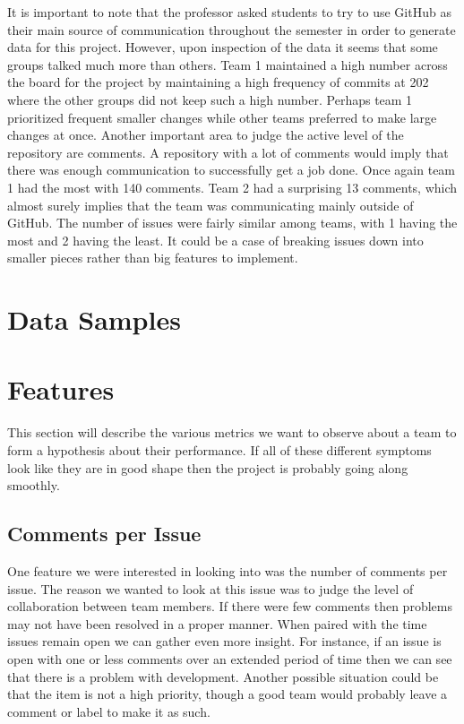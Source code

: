 \documentclass[conference]{IEEEtran}
\begin{document}
It is important to note that the professor asked students to try to use GitHub as their main source of communication throughout the semester in order to generate data for this project. However, upon inspection of the data it seems that some groups talked much more than others. Team 1 maintained a high number across the board for the project by maintaining a high frequency of commits at 202 where the other groups did not keep such a high number. Perhaps team 1 prioritized frequent smaller changes while other teams preferred to make large changes at once. Another important area to judge the active level of the repository are comments. A repository with a lot of comments would imply that there was enough communication to successfully get a job done. Once again team 1 had the most with 140 comments. Team 2 had a surprising 13 comments, which almost surely implies that the team was communicating mainly outside of GitHub. The number of issues were fairly similar among teams, with 1 having the most and 2 having the least. It could be a case of breaking issues down into smaller pieces rather than big features to implement. 

\section{Data Samples}

\section{Features}
This section will describe the various metrics we want to observe about a team to form a hypothesis about their performance. If all of these different symptoms look like they are in good shape then the project is probably going along smoothly. 

\subsection{Comments per Issue}
One feature we were interested in looking into was the number of comments per issue. The reason we wanted to look at this issue was to judge the level of collaboration between team members. If there were few comments then problems may not have been resolved in a proper manner. When paired with the time issues remain open we can gather even more insight. For instance, if an issue is open with one or less comments over an extended period of time then we can see that there is a problem with development. Another possible situation could be that the item is not a high priority, though a good team would probably leave a comment or label to make it as such. 
\end{document}
